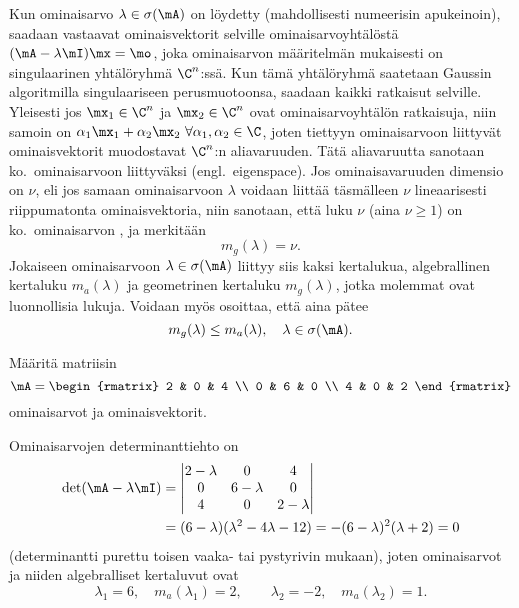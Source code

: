 Kun ominaisarvo $\lambda\in\sigma(\mA)$ on löydetty (mahdollisesti numeerisin apukeinoin),
saadaan vastaavat ominaisvektorit selville ominaisarvoyhtälöstä $(\mA-\lambda\mI)\mx=\mo$, joka
ominaisarvon määritelmän mukaisesti on singulaarinen yhtälöryhmä $\C^n$:ssä. Kun tämä 
yhtälöryhmä saatetaan Gaussin algoritmilla singulaariseen perusmuotoonsa, saadaan kaikki 
ratkaisut selville. Yleisesti jos $\mx_1 \in \C^n$ ja $\mx_2 \in \C^n$ ovat ominaisarvoyhtälön
ratkaisuja, niin samoin on $\alpha_1\mx_1+\alpha_2\mx_2\ \forall \alpha_1,\alpha_2 \in \C$, 
joten tiettyyn ominaisarvoon liittyvät ominaisvektorit muodostavat $\C^n$:n aliavaruuden. Tätä
aliavaruutta sanotaan ko.\ ominaisarvoon liittyväksi
%
 (engl.\ eigenspace).
Jos ominaisavaruuden dimensio on $\nu$, eli jos samaan ominaisarvoon
$\lambda$ voidaan liittää täsmälleen $\nu$ lineaarisesti riippumatonta ominaisvektoria, niin
sanotaan, että luku $\nu$ (aina $\nu\geq 1$) on ko.\ ominaisarvon
%
, ja merkitään
\[
m_g(\lambda)=\nu.
\]
Jokaiseen ominaisarvoon $\lambda\in\sigma(\mA)$ liittyy siis kaksi kertalukua, algebrallinen
kertaluku $m_a(\lambda)$ ja geometrinen kertaluku $m_g(\lambda)$, jotka molemmat ovat
luonnollisia lukuja. Voidaan myös osoittaa, että aina pätee
\[ 
m_g(\lambda)\leq m_a(\lambda), \quad \lambda\in\sigma(\mA).
\]
\begin{Exa} \label{eig-ex1}
Määritä matriisin
\[
\mA=\begin{rmatrix} 2 & 0 & 4 \\ 0 & 6 & 0 \\ 4 & 0 & 2 \end{rmatrix}
\]
ominaisarvot ja ominaisvektorit.
\end{Exa}
\ratk Ominaisarvojen determinanttiehto on
\begin{align*}
\det(\mA-\lambda\mI) &= \begin{vmatrix} 
                        2-\lambda & 0 & 4 \\ 0 & 6-\lambda & 0 \\ 4 & 0 & 2-\lambda 
                        \end{vmatrix} \\ 
                     &= (6-\lambda)(\lambda^2-4\lambda-12) = -(6-\lambda)^2(\lambda+2) = 0
\end{align*}
(determinantti purettu toisen vaaka- tai pystyrivin mukaan), joten ominaisarvot ja niiden 
algebralliset kertaluvut ovat
\[ 
\lambda_1=6, \quad m_a(\lambda_1)=2, \qquad \lambda_2=-2, \quad m_a(\lambda_2)= 1. 
\]
